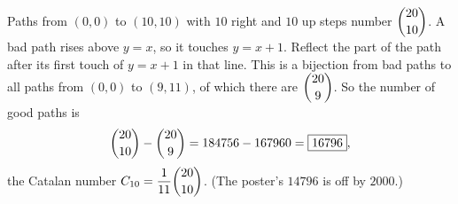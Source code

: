 Paths from $(0,0)$ to $(10,10)$ with $10$ right and $10$ up steps number $\dbinom{20}{10}$. A bad path rises above $y=x$, so it touches $y=x+1$. Reflect the part of the path after its first touch of $y=x+1$ in that line. This is a bijection from bad paths to all paths from $(0,0)$ to $(9,11)$, of which there are $\dbinom{20}{9}$. So the number of good paths is
\[\dbinom{20}{10}-\dbinom{20}{9}=184756-167960=\boxed{16796},\]
the Catalan number $C_{10}=\dfrac{1}{11}\dbinom{20}{10}$. (The poster's $14796$ is off by $2000$.)

